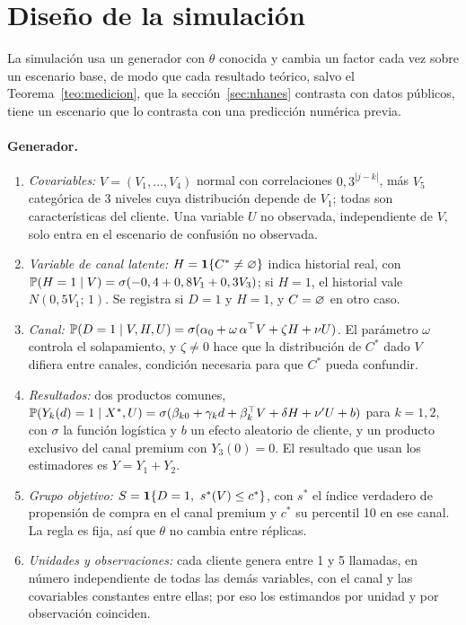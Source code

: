 \section{Diseño de la simulación}\label{sec:diseno}

La simulación usa un generador con $\theta$ conocida y cambia un factor cada vez sobre un escenario base, de modo que cada resultado teórico, salvo el Teorema~\ref{teo:medicion}, que la sección~\ref{sec:nhanes} contrasta con datos públicos, tiene un escenario que lo contrasta con una predicción numérica previa.

\paragraph{Generador.}
\begin{enumerate}
  \item \emph{Covariables:} $V=(V_1,\dots,V_4)$ normal con correlaciones $0,3^{|j-k|}$, más $V_5$ categórica de 3 niveles cuya distribución depende de $V_1$; todas son características del cliente. Una variable $U$ no observada, independiente de $V$, solo entra en el escenario de confusión no observada.
  \item \emph{Variable de canal latente:} $H=\mathbf{1}\{C^*\ne\varnothing\}$ indica historial real, con $\mathbb{P}(H=1\mid V)=\sigma(-0,4+0,8V_1+0,3V_3)$; si $H=1$, el historial vale $N(0,5V_1;\,1)$. Se registra si $D=1$ y $H=1$, y $C=\varnothing$ en otro caso.
  \item \emph{Canal:} $\mathbb{P}(D=1\mid V,H,U)=\sigma(\alpha_0+\omega\,\alpha^\top V+\zeta H+\nu U)$. El parámetro $\omega$ controla el solapamiento, y $\zeta\ne0$ hace que la distribución de $C^*$ dado $V$ difiera entre canales, condición necesaria para que $C^*$ pueda confundir.
  \item \emph{Resultados:} dos productos comunes, $\mathbb{P}(Y_k(d)=1\mid X^*,U)=\sigma(\beta_{k0}+\gamma_k d+\beta_k^\top V+\delta H+\nu'U+b)$ para $k=1,2$, con $\sigma$ la función logística y $b$ un efecto aleatorio de cliente, y un producto exclusivo del canal premium con $Y_3(0)=0$. El resultado que usan los estimadores es $Y=Y_1+Y_2$.
  \item \emph{Grupo objetivo:} $S=\ind\{D=1,\ s^*(V)\le c^*\}$, con $s^*$ el índice verdadero de propensión de compra en el canal premium y $c^*$ su percentil 10 en ese canal. La regla es fija, así que $\theta$ no cambia entre réplicas.
  \item \emph{Unidades y observaciones:} cada cliente genera entre 1 y 5 llamadas, en número independiente de todas las demás variables, con el canal y las covariables constantes entre ellas; por eso los estimandos por unidad y por observación coinciden.

\end{enumerate}

